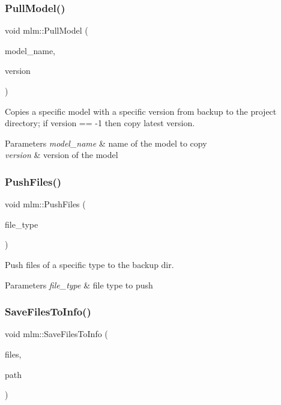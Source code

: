 \subsubsection{\texorpdfstring{Pull\+Model()}{PullModel()}}
{\footnotesize\ttfamily void mlm\+::\+Pull\+Model (\begin{DoxyParamCaption}\item[{std\+::string const \&}]{model\+\_\+name,  }\item[{int}]{version }\end{DoxyParamCaption})}



Copies a specific model with a specific version from backup to the project directory; if version == -\/1 then copy latest version. 


\begin{DoxyParams}{Parameters}
{\em model\+\_\+name} & name of the model to copy \\
\hline
{\em version} & version of the model \\
\hline
\end{DoxyParams}
\mbox{\label{namespacemlm_a68835e331da902afbc67f55a3036ce2d}} 
\subsubsection{\texorpdfstring{Push\+Files()}{PushFiles()}}
{\footnotesize\ttfamily void mlm\+::\+Push\+Files (\begin{DoxyParamCaption}\item[{std\+::string const \&}]{file\+\_\+type }\end{DoxyParamCaption})}



Push files of a specific type to the backup dir. 


\begin{DoxyParams}{Parameters}
{\em file\+\_\+type} & file type to push \\
\hline
\end{DoxyParams}
\mbox{\label{namespacemlm_a5cf15b46d858778a1cfcc8905de90782}} 
\subsubsection{\texorpdfstring{Save\+Files\+To\+Info()}{SaveFilesToInfo()}}
{\footnotesize\ttfamily void mlm\+::\+Save\+Files\+To\+Info (\begin{DoxyParamCaption}\item[{std\+::list$<$ \mbox{\hyperlink{structmlm_1_1fileType}{file\+Type}} $>$ const \&}]{files,  }\item[{std\+::string const \&}]{path }\end{DoxyParamCaption})}



